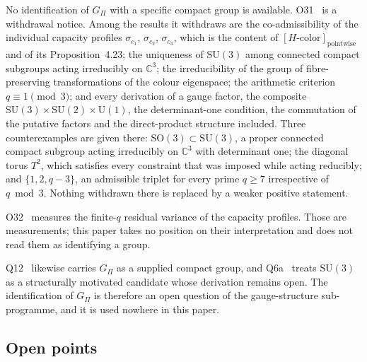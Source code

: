 \documentclass[12pt,a4paper]{article}
\theoremstyle{remark}
\begin{document}
      No identification of $G_\Pi$ with a specific compact group is available.
      O31~\cite{Beau2026a35} is a withdrawal notice.
      Among the results it withdraws are the co-admissibility of the individual capacity profiles
      $\sigma_{c_1}$, $\sigma_{c_2}$, $\sigma_{c_3}$, which is the content of
      $[H\text{-color}]_{\mathrm{pointwise}}$ and of its Proposition~4.23; the uniqueness of
      $\mathrm{SU}(3)$ among connected compact subgroups acting irreducibly on $\mathbb{C}^3$;
      the irreducibility of the group of fibre-preserving transformations of the colour eigenspace;
      the arithmetic criterion $q \equiv 1 \pmod 3$; and every derivation of a gauge factor, the
      composite $\mathrm{SU}(3) \times \mathrm{SU}(2) \times \mathrm{U}(1)$, the
      determinant-one condition, the commutation of the putative factors and the direct-product
      structure included.
      Three counterexamples are given there: $\mathrm{SO}(3) \subset \mathrm{SU}(3)$, a proper
      connected compact subgroup acting irreducibly on $\mathbb{C}^3$ with determinant one; the
      diagonal torus $T^2$, which satisfies every constraint that was imposed while acting
      reducibly; and $\{1, 2, q-3\}$, an admissible triplet for every prime $q \geq 7$
      irrespective of $q \bmod 3$.
      Nothing withdrawn there is replaced by a weaker positive statement.

      O32~\cite{Beau2026a36} measures the finite-$q$ residual variance of the capacity profiles.
      Those are measurements; this paper takes no position on their interpretation and does not
      read them as identifying a group.

      Q12~\cite{Beau2026q12} likewise carries $G_\Pi$ as a supplied compact group, and
      Q6a~\cite{Beau2026q6a} treats $\mathrm{SU}(3)$ as a structurally motivated candidate whose
      derivation remains open.
      The identification of $G_\Pi$ is therefore an open question of the gauge-structure
      sub-programme, and it is used nowhere in this paper.

    \subsection{Open points}
      \label{ssec:open}
\end{document}
